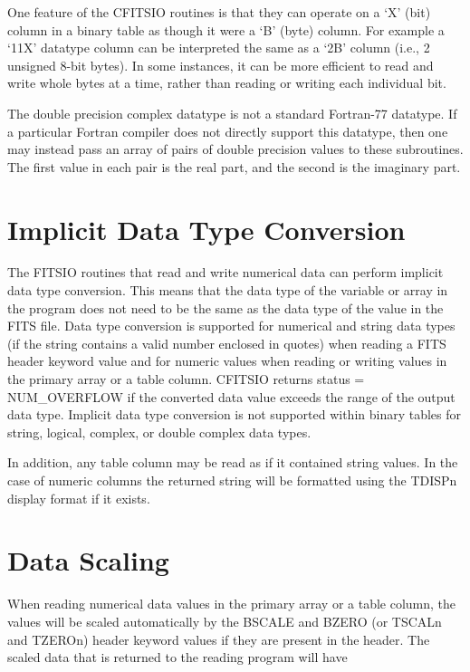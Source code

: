 \documentclass[11pt]{book}
\begin{document}
One feature of the CFITSIO routines is that they can operate on a `X'
(bit) column in a binary table as though it were a `B' (byte) column.
For example a `11X' datatype column can be interpreted the same as a
`2B' column (i.e., 2 unsigned 8-bit bytes).  In some instances, it can
be more efficient to read and write whole bytes at a time, rather than
reading or writing each individual bit.

The double precision complex datatype is not a standard Fortran-77
datatype.  If a particular Fortran compiler does not directly support
this datatype,  then one may instead pass an array of pairs of double
precision values to these subroutines.  The first  value in each pair
is the real part, and the second is the imaginary part.


\section{Implicit Data Type Conversion}

The FITSIO routines that read and write numerical data can perform
implicit data type conversion.  This means that the data type of the
variable or array in the program does not need to be the same as the
data type of the value in the FITS file.  Data type conversion is
supported for numerical and string data types (if the string contains a
valid number enclosed in quotes) when reading a FITS header keyword
value and for numeric values when reading or writing values in the
primary array or a table column.  CFITSIO returns status =
NUM\_OVERFLOW  if the converted data value exceeds the range of the
output data type.  Implicit data type conversion is not supported
within binary tables for string, logical, complex, or double complex
data types.

In addition, any table column may be read as if it contained string values.
In the case of numeric columns the returned string will be formatted
using the TDISPn display format if it exists.


\section{Data Scaling}

When reading numerical data values in the primary array or a
table column, the values will be scaled automatically by the BSCALE and
BZERO (or TSCALn and TZEROn) header keyword values if they are
present in the header.  The scaled data that is returned to the reading
program will have
\end{document}
